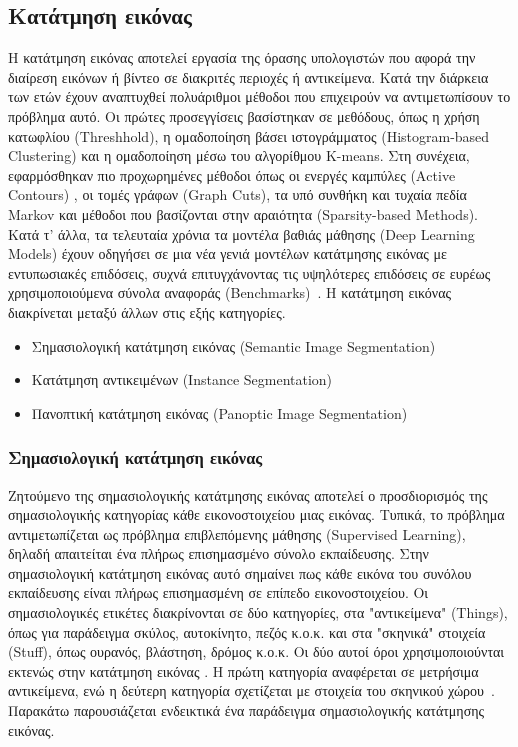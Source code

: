 \documentclass[12pt]{article}
\numberwithin{equation}{section}
\begin{document}
\subsection{Κατάτμηση εικόνας}

Η κατάτμηση εικόνας αποτελεί εργασία της όρασης υπολογιστών που αφορά την διαίρεση εικόνων ή βίντεο σε διακριτές περιοχές ή αντικείμενα. Κατά την διάρκεια των ετών έχουν αναπτυχθεί πολυάριθμοι μέθοδοι που επιχειρούν να αντιμετωπίσουν το πρόβλημα αυτό. Οι πρώτες προσεγγίσεις βασίστηκαν σε μεθόδους, όπως η χρήση κατωφλίου (Threshhold), η ομαδοποίηση βάσει ιστογράμματος (Histogram-based Clustering) και η ομαδοποίηση μέσω του αλγορίθμου K-means. Στη συνέχεια, εφαρμόσθηκαν πιο προχωρημένες μέθοδοι όπως οι ενεργές καμπύλες (Αctive Contours) , οι τομές γράφων (Graph Cuts), τα υπό συνθήκη και τυχαία πεδία Markov και μέθοδοι που βασίζονται στην αραιότητα (Sparsity-based Methods). Κατά τ’ άλλα, τα τελευταία χρόνια τα μοντέλα βαθιάς μάθησης (Deep Learning Models) έχουν οδηγήσει σε μια νέα γενιά μοντέλων κατάτμησης εικόνας με εντυπωσιακές επιδόσεις, συχνά επιτυγχάνοντας τις υψηλότερες επιδόσεις σε ευρέως χρησιμοποιούμενα σύνολα αναφοράς (Benchmarks)~\cite{DBLP:journals/corr/abs-2001-05566}. Η κατάτμηση εικόνας διακρίνεται μεταξύ άλλων στις εξής κατηγορίες.

\begin{itemize}
    \item Σημασιολογική κατάτμηση εικόνας (Semantic Image Segmentation)
    \item Κατάτμηση αντικειμένων (Instance Segmentation)
    \item Πανοπτική κατάτμηση εικόνας (Panoptic Image Segmentation)
\end{itemize}

\subsubsection{Σημασιολογική κατάτμηση εικόνας}

Ζητούμενο της σημασιολογικής κατάτμησης εικόνας αποτελεί ο προσδιορισμός της σημασιολογικής κατηγορίας κάθε εικονοστοιχείου μιας εικόνας. Τυπικά, το πρόβλημα αντιμετωπίζεται ως πρόβλημα επιβλεπόμενης μάθησης (Supervised Learning), δηλαδή απαιτείται ένα πλήρως επισημασμένο σύνολο εκπαίδευσης. Στην σημασιολογική κατάτμηση εικόνας αυτό σημαίνει πως κάθε εικόνα του συνόλου εκπαίδευσης είναι πλήρως επισημασμένη σε επίπεδο εικονοστοιχείου. Οι σημασιολογικές ετικέτες διακρίνονται σε δύο κατηγορίες, στα "αντικείμενα" (Things), όπως για παράδειγμα σκύλος, αυτοκίνητο, πεζός κ.ο.κ. και στα "σκηνικά" στοιχεία (Stuff), όπως ουρανός, βλάστηση, δρόμος κ.ο.κ. Οι δύο αυτοί όροι χρησιμοποιούνται εκτενώς στην κατάτμηση εικόνας . Η πρώτη κατηγορία αναφέρεται σε μετρήσιμα αντικείμενα, ενώ η δεύτερη κατηγορία σχετίζεται με στοιχεία του σκηνικού χώρου~\cite{csurka2023semanticimagesegmentationdecades}. Παρακάτω παρουσιάζεται ενδεικτικά ένα παράδειγμα σημασιολογικής κατάτμησης εικόνας.\\
\end{document}
